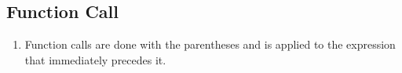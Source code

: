 \subsection{Function Call}

\begin{enumerate}
\item Function calls are done with the parentheses and is applied to the expression that immediately precedes it.
\end{enumerate}